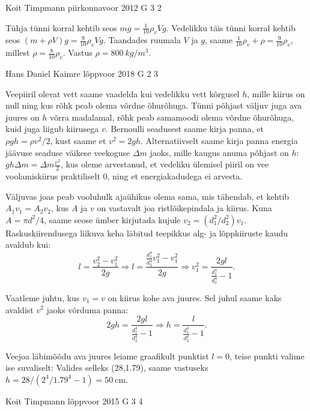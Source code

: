 \documentclass[11pt, twoside]{article}
\begin{document}
{%
{Koit Timpmann} %
{piirkonnavoor} %
{2012} %
{G 3} %
{2} %
{

\ifSolution
Tühja tünni korral kehtib seos $mg=\frac 1{10}\rho_vVg$.
Vedelikku täis tünni korral kehtib seos	 $(m+\rho V)g=\frac 9{10}\rho_vVg$.
Taandades ruumala $V$ ja $g$, saame  $\frac 1{10}\rho_v+\rho=\frac 9{10}\rho_v$, millest $\rho=\frac 8{10}\rho_v$.
Vastus $\rho= \SI{800}{kg/m^3}$.
\fi
}

{Hans Daniel Kaimre} %
{lõppvoor} %
{2018} %
{G 2} %
{3} %
{

\ifSolution
Veepiiril olevat vett saame vaadelda kui vedelikku vett kõrgusel $h$, mille kiirus on null ning kus rõhk peab olema võrdne õhurõhuga. Tünni põhjast väljuv juga ava juures on $h$ võrra madalamal, rõhk peab samamoodi olema võrdne õhurõhuga, kuid juga liigub kiirusega $v$. Bernoulli seadusest saame kirja panna, et $\rho g h = \rho v^2/2$, kust saame et $v^2=2gh$. Alternatiivselt saame kirja panna energia jäävuse seaduse väikese veekoguse $\Delta m$ jaoks, mille kaugus anuma põhjast on $h$: $ g h \Delta m = \Delta m \frac{v^2}{2}$, kus oleme arvestanud, et vedeliku ülemisel piiril on vee voolamiskiirus praktiliselt 0, ning et energiakadudega ei arvesta.  

Väljuvas joas peab vooluhulk ajaühikus olema sama, mis tähendab, et kehtib $A_1v_1=A_2v_2$, kus $A$ ja $v$ on vastavalt joa ristlõikepindala ja kiirus. Kuna $A=\pi d^2/4$, saame seose ümber kirjutada kujule $v_2=(d_1^2/d_2^2)v_1$. Raskuskiirendusega liikuva keha läbitud teepikkus alg- ja lõppkiiruste kaudu avaldub kui:
$$l=\frac{v_2^2-v_1^2}{2g} \Rightarrow l=\frac{\frac{d_1^4}{d_2^4}v_1^2-v_1^2}{2g} \Rightarrow v_1^2=\frac{2gl}{\frac{d_1^4}{d_2^4}-1}.$$

Vaatleme juhtu, kus $v_1=v$ on kiirus kohe ava juures. Sel juhul saame kaks avaldist $v^2$ jaoks võrduma panna:
$$2gh=\frac{2gl}{\frac{d_1^4}{d_2^4}-1}\Rightarrow h=\frac{l}{\frac{d_1^4}{d_2^4}-1}.$$

Veejoa läbimõõdu ava juures leiame graafikult punktist $l=0$, teise punkti valime ise suvaliselt: Valides selleks (28,\num{1.79}), saame vastuseks $h=28/(2^4/\num{1.79}^4-1)=\SI{50}{\cm}$.
\fi
}

{Koit Timpmann} %
{lõppvoor} %
{2015} %
{G 3} %
{4} %
{

}}
\end{document}

